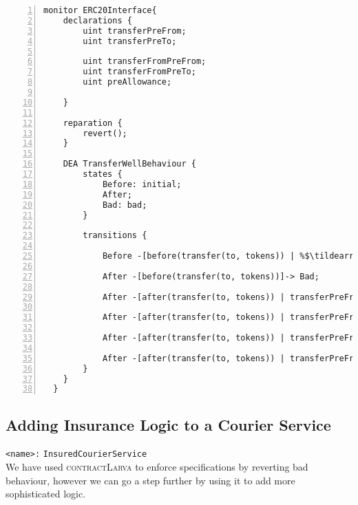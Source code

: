 \documentclass{article}
\newcommand{\contractlarva}{\textsc{contractLarva}\xspace}
\newcommand{\tildearrow}{{\raise.37ex\hbox{$\scriptstyle\mathtt{\sim}$}}\hspace{-0.08cm}>\xspace}
\begin{document}
      
  \small\begin{lstlisting}[language=DEA,basicstyle=\scriptsize,numbers=left,numbersep=2pt,xleftmargin=0.3cm,escapechar=\%,label={dea:erc20},caption={Monitor that ensures well-behaviour of \texttt{transfer} function with appropriate pre- and post-conditions.}]
  monitor ERC20Interface{
  	declarations {
  		uint transferPreFrom;
  		uint transferPreTo;
  
  		uint transferFromPreFrom;
  		uint transferFromPreTo;
  		uint preAllowance;
  
  	}
  
  	reparation {
  		revert();
  	}
  
  	DEA TransferWellBehaviour {
  		states {		
  			Before: initial;
  			After;
  			Bad: bad;
  		}
  		
  		transitions {
  		
  			Before -[before(transfer(to, tokens)) | %$\tildearrow$% {transferPreFrom = balanceOf(msg.sender); transferPreTo = balanceOf(to);}]-> After;	
  
  			After -[before(transfer(to, tokens))]-> Bad;
  			
  			After -[after(transfer(to, tokens)) | transferPreFrom < tokens && (balanceOf(msg.sender) != transferPreFrom || balanceOf(to) != transferPreTo)]-> Bad;
  
  			After -[after(transfer(to, tokens)) | transferPreFrom < tokens && (balanceOf(msg.sender) == transferPreFrom && balanceOf(to) == transferPreTo)]-> Before;
  
  			After -[after(transfer(to, tokens)) | transferPreFrom >= tokens && (balanceOf(msg.sender) != (transferPreFrom - tokens) || balanceOf(to) != (transferPreTo - tokens))]-> Bad;
  
  			After -[after(transfer(to, tokens)) | transferPreFrom >= tokens && (balanceOf(msg.sender) == (transferPreFrom - tokens) && balanceOf(to) == (transferPreTo - tokens))]-> Before;	
  		}
  	}
  }
      \end{lstlisting}\normalsize
 
 \subsection{Adding Insurance Logic to a Courier Service}
         \texttt{<name>:} \verb+InsuredCourierService+\\
         
 We have used \contractlarva to enforce specifications by reverting bad behaviour, however we can go a step further by using it to add more sophisticated logic. 
 
\end{document}
